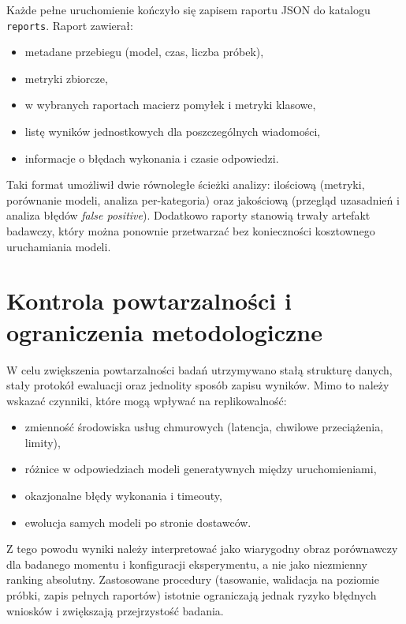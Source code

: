 \documentclass[12pt,a4paper,openright]{report}
\begin{document}
Każde pełne uruchomienie kończyło się zapisem raportu JSON do katalogu \texttt{reports}. Raport zawierał:

\begin{itemize}
    \item metadane przebiegu (model, czas, liczba próbek),
    \item metryki zbiorcze,
    \item w wybranych raportach macierz pomyłek i metryki klasowe,
    \item listę wyników jednostkowych dla poszczególnych wiadomości,
    \item informacje o błędach wykonania i czasie odpowiedzi.
\end{itemize}

Taki format umożliwił dwie równoległe ścieżki analizy: ilościową (metryki, porównanie modeli, analiza per-kategoria) oraz jakościową (przegląd uzasadnień i analiza błędów \textit{false positive}). Dodatkowo raporty stanowią trwały artefakt badawczy, który można ponownie przetwarzać bez konieczności kosztownego uruchamiania modeli.

\section{Kontrola powtarzalności i ograniczenia metodologiczne}

W celu zwiększenia powtarzalności badań utrzymywano stałą strukturę danych, stały protokół ewaluacji oraz jednolity sposób zapisu wyników. Mimo to należy wskazać czynniki, które mogą wpływać na replikowalność:

\begin{itemize}
    \item zmienność środowiska usług chmurowych (latencja, chwilowe przeciążenia, limity),
    \item różnice w odpowiedziach modeli generatywnych między uruchomieniami,
    \item okazjonalne błędy wykonania i timeouty,
    \item ewolucja samych modeli po stronie dostawców.
\end{itemize}

Z tego powodu wyniki należy interpretować jako wiarygodny obraz porównawczy dla badanego momentu i konfiguracji eksperymentu, a nie jako niezmienny ranking absolutny. Zastosowane procedury (tasowanie, walidacja na poziomie próbki, zapis pełnych raportów) istotnie ograniczają jednak ryzyko błędnych wniosków i zwiększają przejrzystość badania.
\end{document}
